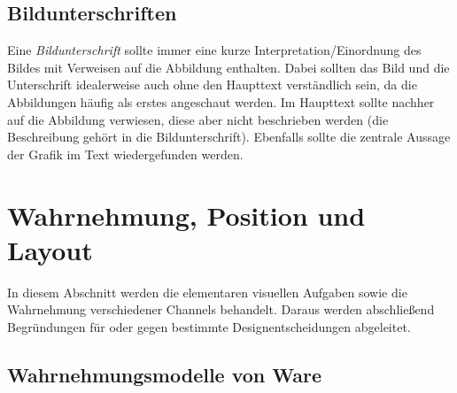 	\subsection{Bildunterschriften}
		Eine \emph{Bildunterschrift} sollte immer eine kurze Interpretation/Einordnung des Bildes mit Verweisen auf die Abbildung enthalten. Dabei sollten das Bild und die Unterschrift idealerweise auch ohne den Haupttext verständlich sein, da die Abbildungen häufig als erstes angeschaut werden. Im Haupttext sollte nachher auf die Abbildung verwiesen, diese aber nicht beschrieben werden (die Beschreibung gehört in die Bildunterschrift). Ebenfalls sollte die zentrale Aussage der Grafik im Text wiedergefunden werden.

\section{Wahrnehmung, Position und Layout}
	\label{sec:wahrnehmung}

	In diesem Abschnitt werden die elementaren visuellen Aufgaben sowie die Wahrnehmung verschiedener Channels behandelt. Daraus werden abschließend Begründungen für oder gegen bestimmte Designentscheidungen abgeleitet.

	\subsection{Wahrnehmungsmodelle von Ware}
		\label{subsec:wahrnehmungWare}

